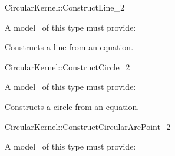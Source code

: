 
\begin{ccRefFunctionObjectConcept}{CircularKernel::ConstructLine_2}

\ccRefines


A model \ccVar\ of this type must provide:

{Constructs a line from an equation.}

\end{ccRefFunctionObjectConcept}
\begin{ccRefFunctionObjectConcept}{CircularKernel::ConstructCircle_2}

\ccRefines


A model \ccVar\ of this type must provide:

{Constructs a circle from an equation.}

\end{ccRefFunctionObjectConcept}
\begin{ccRefFunctionObjectConcept}{CircularKernel::ConstructCircularArcPoint_2}

A model \ccVar\ of this type must provide:

{}

{}

\end{ccRefFunctionObjectConcept}
